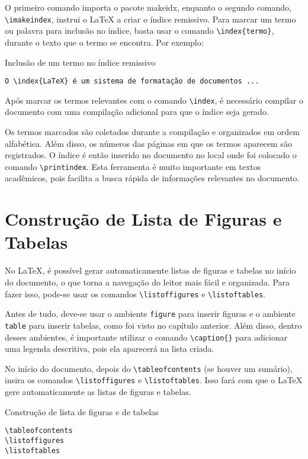 \noindent O primeiro comando importa o pacote makeidx, enquanto o segundo comando, \verb|\imakeindex|, instrui o \LaTeX{} a criar o índice remissivo. Para marcar um termo ou palavra para inclusão no índice, basta usar o comando \verb|\index{termo}|, durante o texto que o termo se encontra. Por exemplo:

\begin{trailer}{Inclusão de um termo no \'indice remissivo}
\begin{verbatim} 
O \index{LaTeX} é um sistema de formatação de documentos ...\end{verbatim}
\end{trailer}

\noindent Após marcar os termos relevantes com o comando \verb|\index|, é necessário compilar o documento com uma compilação adicional para que o índice seja gerado.

\noindent Os termos marcados são coletados durante a compilação e organizados em ordem alfabética. Além disso, os números das páginas em que os termos aparecem são registrados. O índice é então inserido no documento no local onde foi colocado o comando \verb|\printindex|. Esta ferramenta é muito importante em textos acadêmicos, pois facilita a busca rápida de informações relevantes no documento.

\section{Constru\c c\~ao de Lista de Figuras e Tabelas}
\label{sec:3}

No \LaTeX{}, é possível gerar automaticamente listas de figuras e tabelas no início do documento, o que torna a navegação do leitor mais fácil e organizada. Para fazer isso, pode-se usar os comandos \verb|\listoffigures| e \verb|\listoftables|. 

\noindent Antes de tudo, deve-se usar o ambiente \verb|figure| para inserir figuras e o ambiente \verb|table| para inserir tabelas, como foi visto no capítulo anterior. Além disso, dentro desses ambientes, é importante utilizar o comando \verb|\caption{}| para adicionar uma legenda descritiva, pois ela aparecerá na lista criada.

\noindent No início do documento, depois do \verb|\tableofcontents| (se houver um sumário), insira os comandos \verb|\listoffigures| e \verb|\listoftables|. Isso fará com que o \LaTeX{} gere automaticamente as listas de figuras e tabelas.

\begin{trailer}{Construção de lista de figuras e de tabelas}
\begin{verbatim} 
\tableofcontents
\listoffigures
\listoftables \end{verbatim}
\end{trailer}

